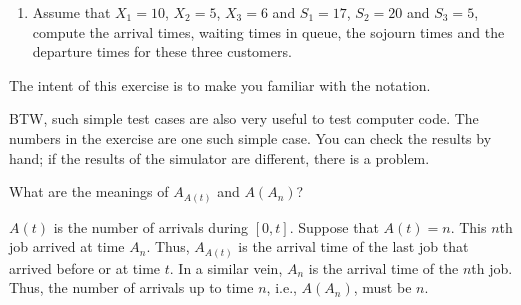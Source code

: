 \begin{question}
  \begin{enumerate}
  \item Assume that $X_1=10$, $X_2=5$, $X_3=6$ and $S_1 = 17$,
    $S_2=20$ and $S_3=5$, compute the arrival times, waiting times in
    queue, the sojourn times and the departure times for these three
    customers.
  \end{enumerate}
  \begin{solution}
     The intent of this exercise is
      to make you familiar with the notation.

      BTW, such simple test cases are also very useful to test
      computer code. The numbers in the exercise are one such simple
      case. You can check the results by hand; if the results of the
      simulator are different, there is a problem.
    \end{solution}
  \end{question}
  
\begin{question}
 What are  the meanings of $A_{A(t)}$ and $A(A_n)$?
 \begin{solution}
  $A(t)$ is the number of arrivals during $[0,t]$. Suppose that
    $A(t) = n$. This $n$th job arrived at time $A_n$. Thus, $A_{A(t)}$
    is the arrival time of the last job that arrived before or at time
    $t$. In a similar vein, $A_n$ is the arrival time of the $n$th
    job. Thus, the number of arrivals up to time $n$, i.e., $A(A_n)$,
    must be $n$.
  \end{solution}
\end{question}


